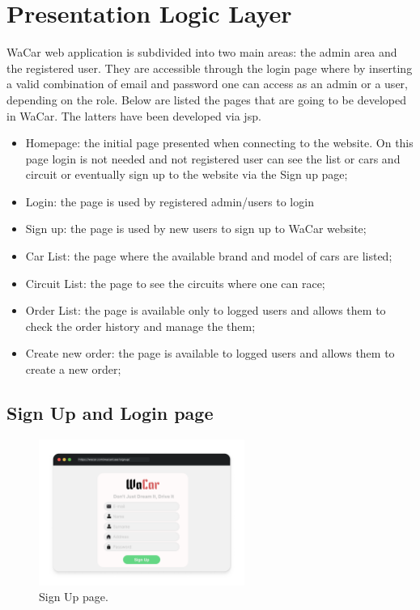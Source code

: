 \section{Presentation Logic Layer}


WaCar web application is subdivided into two main areas: the admin area and the registered user. They are accessible through the login page where by inserting a valid combination of email and password one can access as an admin or a user, depending on the role. Below are listed the pages that are going to be developed in WaCar. The latters have been developed via jsp.
\begin{itemize}
    \item Homepage: the initial page presented when connecting to the website. On this page login is not needed and not registered user can see the list or cars and circuit or eventually sign up to the website via the Sign up page;
    \item Login: the page is used by registered admin/users to login
    \item Sign up: the page is used by new users to sign up to WaCar website;
    \item Car List: the page where the available brand and model of cars are listed;
    \item Circuit List: the page to see the circuits where one can race;
    \item Order List: the page is available only to logged users and allows them to check the order history and manage the them;
    \item Create new order: the page is available to logged users and allows them to create a new order;
\end{itemize}

\subsection{Sign Up and Login page}

\begin{figure}[h]
  \centering
    \includegraphics[width=0.6\textwidth]{mockup/SignUp.png}
    \caption{Sign Up page.}
    \label{fig:signup}
\end{figure}

